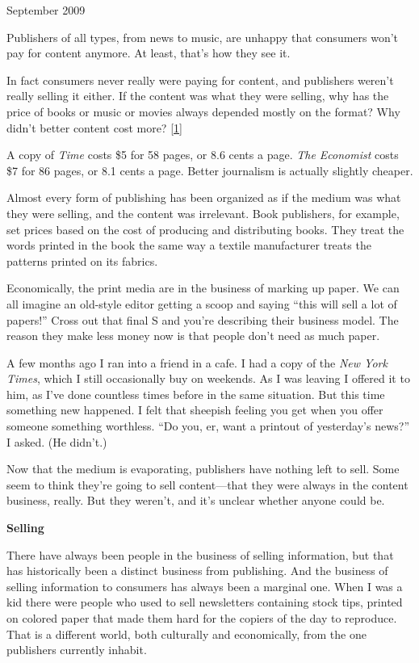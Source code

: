 September 2009

Publishers of all types, from news to music, are unhappy that consumers
won't pay for content anymore. At least, that's how they see it.

In fact consumers never really were paying for content, and publishers
weren't really selling it either. If the content was what they were
selling, why has the price of books or music or movies always depended
mostly on the format? Why didn't better content cost more?
{[}\hyperref[f1n]{1}{]}

A copy of \emph{Time} costs \$5 for 58 pages, or 8.6 cents a page.
\emph{The Economist} costs \$7 for 86 pages, or 8.1 cents a page. Better
journalism is actually slightly cheaper.

Almost every form of publishing has been organized as if the medium was
what they were selling, and the content was irrelevant. Book publishers,
for example, set prices based on the cost of producing and distributing
books. They treat the words printed in the book the same way a textile
manufacturer treats the patterns printed on its fabrics.

Economically, the print media are in the business of marking up paper.
We can all imagine an old-style editor getting a scoop and saying ``this
will sell a lot of papers!'' Cross out that final S and you're
describing their business model. The reason they make less money now is
that people don't need as much paper.

A few months ago I ran into a friend in a cafe. I had a copy of the
\emph{New York Times}, which I still occasionally buy on weekends. As I
was leaving I offered it to him, as I've done countless times before in
the same situation. But this time something new happened. I felt that
sheepish feeling you get when you offer someone something worthless.
``Do you, er, want a printout of yesterday's news?'' I asked. (He
didn't.)

Now that the medium is evaporating, publishers have nothing left to
sell. Some seem to think they're going to sell content---that they were
always in the content business, really. But they weren't, and it's
unclear whether anyone could be.

\textbf{Selling}

There have always been people in the business of selling information,
but that has historically been a distinct business from publishing. And
the business of selling information to consumers has always been a
marginal one. When I was a kid there were people who used to sell
newsletters containing stock tips, printed on colored paper that made
them hard for the copiers of the day to reproduce. That is a different
world, both culturally and economically, from the one publishers
currently inhabit.

